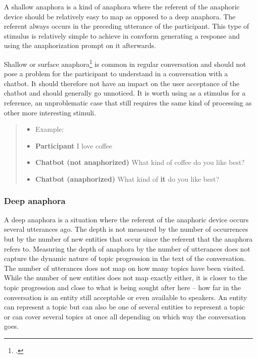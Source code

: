 \documentclass[12pt]{report}
\newcommand{\utterance}[3]{%
    \textbf{#1} #2%
    \ifx\relax#3\relax%
    \else \\ \textit{#3}%
    \fi%
}
\begin{document}
{A shallow anaphora is a kind of anaphora
where the referent of the anaphoric device
should be relatively easy to map
as opposed to a deep anaphora.
The referent always occurs
in the preceding utterance of the participant.
This type of stimulus is relatively simple to achieve
in convform
generating a response
and using the anaphorization prompt on it afterwards.

Shallow or surface anaphora\footcite{hoji2003surface} is common in regular conversation
and should not pose a problem for the participant to understand
in a conversation with a chatbot.
It should therefore not have an impact
on the user acceptance of the chatbot
and should generally go unnoticed.
It is worth using as a stimulus
for a reference, an unproblematic case
that still requires the same kind of processing
as other more interesting stimuli.

\begin{quote}
\begin{itemize}[label={}, leftmargin=0pt, itemsep=0.5em]
\item Example:
\item \utterance{Participant}{I love coffee}{}
\item \utterance{Chatbot (not anaphorized)}{What kind of coffee do you like best?}{}
\item \utterance{Chatbot (anaphorized)} {What kind of \textbf{it} do you like best?}{}
\end{itemize}
\end{quote}

\subsubsection{Deep anaphora}

A deep anaphora is a situation
where the referent of the anaphoric device
occurs several utterances ago.
The depth is not measured by the number of occurrences
but by the number of new entities that occur
since the referent that the anaphora refers to.
Measuring the depth of anaphora by the number of utterances
does not capture the dynamic nature
of topic progression in the text of the conversation.
The number of utterances does not map
on how many topics have been visited.
While the number of new entities does not
map exactly either,
it is closer to the topic progression
and close to
what is being sought after here –
how far in the conversation is an entity
still acceptable or even available to speakers.
An entity can represent a topic
but can also be one of several entities to represent a topic
or can cover several topics at once
all depending on which way the conversation goes.

}
\end{document}
